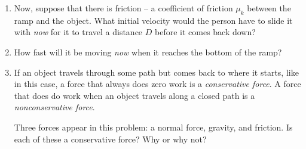 \documentclass[12pt]{article}
\begin{document}
\begin{enumerate}
\begin{enumerate}
	\vspace{2in}
	
	\newpage
	
\item	Now, suppose that there is friction -- a coefficient of friction $\mu_k$ between the ramp and the object. 
What initial velocity would the person have to slide it with {\it now} for it to travel a distance $D$ before it comes back down?

\vspace{3in}


\item How fast will it be moving {\it now} when it reaches the bottom of the ramp? 

\vspace{3.7in}

\item If an object travels through some path but comes back to where it starts, like in this case, a force that always does zero work is a {\it conservative force}. A force that does do work when an object travels along a closed path is a {\it nonconservative force}.

Three forces appear in this problem: a normal force, gravity, and friction. Is each of these a conservative force? Why or why not?


	
	
\end{enumerate}
%

\end{enumerate}
%
%
%
%
%	
%	
\end{document}
